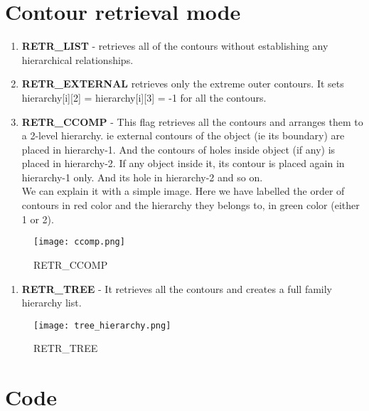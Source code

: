 \documentclass[]{article}
\providecommand{\tightlist}{%
  \setlength{\itemsep}{0pt}\setlength{\parskip}{0pt}}
\begin{document}
\section{Contour retrieval mode}\label{contour-retrieval-mode}

\begin{enumerate}
\def\labelenumi{\arabic{enumi}.}
\tightlist
\item
  \textbf{RETR\_LIST} - retrieves all of the contours without
  establishing any hierarchical relationships.\\
\item
  \textbf{RETR\_EXTERNAL} retrieves only the extreme outer contours. It
  sets hierarchy{[}i{]}{[}2{]} = hierarchy{[}i{]}{[}3{]} = -1 for all
  the contours.\\
\item
  \textbf{RETR\_CCOMP} - This flag retrieves all the contours and
  arranges them to a 2-level hierarchy. ie external contours of the
  object (ie its boundary) are placed in hierarchy-1. And the contours
  of holes inside object (if any) is placed in hierarchy-2. If any
  object inside it, its contour is placed again in hierarchy-1 only. And
  its hole in hierarchy-2 and so on.\\
  We can explain it with a simple image. Here we have labelled the order
  of contours in red color and the hierarchy they belongs to, in green
  color (either 1 or 2).
\end{enumerate}

\begin{figure}[htbp]
\centering
\texttt{[image: ccomp.png]}
\caption{RETR\_CCOMP}
\end{figure}

\begin{enumerate}
\def\labelenumi{\arabic{enumi}.}
\setcounter{enumi}{3}
\tightlist
\item
  \textbf{RETR\_TREE} - It retrieves all the contours and creates a full
  family hierarchy list.
\end{enumerate}

\begin{figure}[htbp]
\centering
\texttt{[image: tree\_hierarchy.png]}
\caption{RETR\_TREE}
\end{figure}

\newpage
\section{Code}\label{code}
\end{document}
